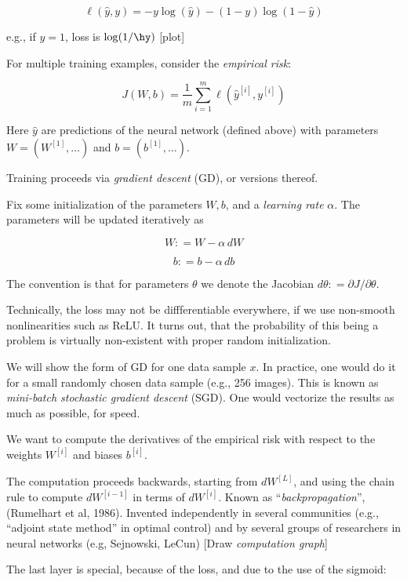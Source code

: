 \documentclass[english]{article}
\begin{document}
$$\ell(\hat y,y) = - y \log(\hat y) - (1-y) \log(1-\hat y)$$


e.g., if $y = 1$, loss is $\log(1/\hy)$ [plot]

For multiple training examples, consider the \emph{empirical risk}: 

$$J(W,b) = \frac{1}{m} \sum_{i=1}^m\ell(\hat y^{[i]},y^{[i]})$$

Here $\hat y$ are predictions of the neural network (defined above) with parameters $W  = (W^{[1]}, \ldots)$ and $b  = (b^{[1]}, \ldots)$. 

\item Training proceeds via \emph{gradient descent} (GD), or versions thereof. 

Fix some initialization of the parameters $W,b$, and a \emph{learning rate} $\alpha$. The parameters will be updated iteratively as 

$$W: = W - \alpha\, dW$$

$$b: = b - \alpha\, db$$

The convention is that for parameters $\theta$ we denote the Jacobian $d\theta: = \partial J/\partial\theta$. 

Technically, the loss may not be diffferentiable everywhere, if we use non-smooth nonlinearities such as ReLU. It turns out, that the probability of this being a problem is virtually non-existent with proper random initialization. 

\item We will show the form of GD for one data sample $x$. In practice, one would do it for a small randomly chosen data sample  (e.g., 256 images). This is known as \emph{mini-batch stochastic gradient descent} (SGD). One would vectorize the results as much as possible, for speed. 

We want to compute the derivatives of the empirical risk with respect to the weights $W^{[i]}$ and biases $b^{[i]}$. 

The computation proceeds backwards, starting from $dW^{[L]}$, and using the chain rule to compute $dW^{[i-1]}$ in terms of $dW^{[i]}$. Known as ``\emph{backpropagation}'',  (Rumelhart et al, 1986). Invented independently in several communities (e.g., ``adjoint state method'' in optimal control) and by several groups of researchers in neural networks (e.g, Sejnowski, LeCun) [Draw \emph{computation graph}]

\benum 
\item 
The last layer is special, because of the loss, and due to the use of the sigmoid: 
\end{document}
